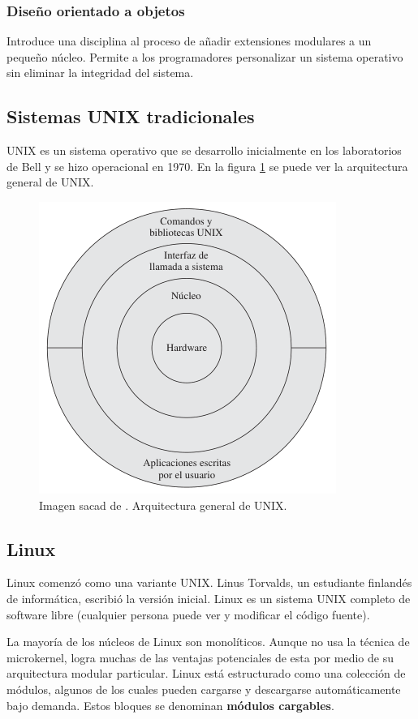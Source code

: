 \documentclass[12pt]{article}
\begin{document}
  \subsubsection{Diseño orientado a objetos}
  Introduce una disciplina al proceso de añadir extensiones modulares a un pequeño núcleo. Permite a los programadores personalizar un sistema operativo sin eliminar la integridad del sistema.

  \subsection{Sistemas UNIX tradicionales}
  UNIX es un sistema operativo que se desarrollo inicialmente en los laboratorios de Bell y se hizo operacional en 1970. En la figura \ref{fig:arq-unix} se puede ver la arquitectura general de UNIX.

  \begin{figure}[H]
    \centering
    \includegraphics[width=0.6\linewidth]{imagenes/arquitectura-unix.png}
    \caption{Imagen sacad de \parencite{sostallings}. Arquitectura general de UNIX.}
    \label{fig:arq-unix}
  \end{figure}

  \subsection{Linux}
  Linux comenzó como una variante UNIX. Linus Torvalds, un estudiante finlandés de informática, escribió la versión inicial. Linux es un sistema UNIX completo de software libre (cualquier persona puede ver y modificar el código fuente).

  La mayoría de los núcleos de Linux son monolíticos.  Aunque no usa la técnica de microkernel, logra muchas de las ventajas potenciales de esta por medio de su arquitectura modular particular. Linux está estructurado como una colección de módulos, algunos de los cuales pueden cargarse y descargarse automáticamente bajo demanda. Estos bloques se denominan \textbf{módulos cargables}.
\end{document}

